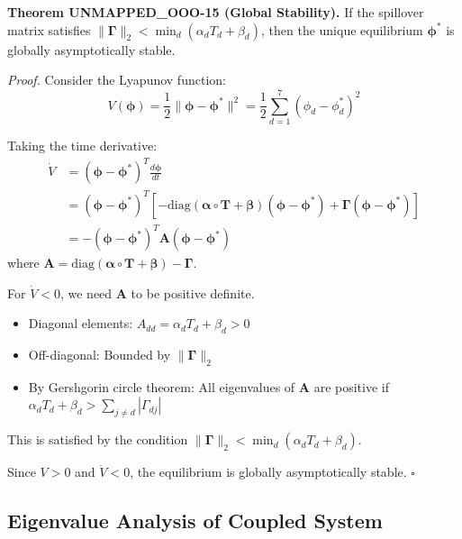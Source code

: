 \begin{tcolorbox}[colback=green!5!white, colframe=green!75!black, title=Theorem UNMAPPED_OOO-15: Global Asymptotic Stability]
\textbf{Theorem UNMAPPED_OOO-15 (Global Stability).}
If the spillover matrix satisfies $\|\boldsymbol{\Gamma}\|_2 < \min_d(\alpha_d T_d + \beta_d)$,
then the unique equilibrium $\boldsymbol{\phi}^*$ is globally asymptotically stable.

\textit{Proof.}
Consider the Lyapunov function:
\begin{equation}
V(\boldsymbol{\phi}) = \frac{1}{2} \|\boldsymbol{\phi} - \boldsymbol{\phi}^*\|^2 = \frac{1}{2} \sum_{d=1}^{7} (\phi_d - \phi_d^*)^2
\end{equation}

Taking the time derivative:
\begin{align}
\dot{V} &= (\boldsymbol{\phi} - \boldsymbol{\phi}^*)^T \frac{d\boldsymbol{\phi}}{dt} \\
&= (\boldsymbol{\phi} - \boldsymbol{\phi}^*)^T \left[-\text{diag}(\boldsymbol{\alpha} \circ \mathbf{T} + \boldsymbol{\beta})(\boldsymbol{\phi} - \boldsymbol{\phi}^*) + \boldsymbol{\Gamma}(\boldsymbol{\phi} - \boldsymbol{\phi}^*)\right] \\
&= -(\boldsymbol{\phi} - \boldsymbol{\phi}^*)^T \mathbf{A} (\boldsymbol{\phi} - \boldsymbol{\phi}^*)
\end{align}
where $\mathbf{A} = \text{diag}(\boldsymbol{\alpha} \circ \mathbf{T} + \boldsymbol{\beta}) - \boldsymbol{\Gamma}$.

For $\dot{V} < 0$, we need $\mathbf{A}$ to be positive definite.
\begin{itemize}[nosep]
\item Diagonal elements: $A_{dd} = \alpha_d T_d + \beta_d > 0$
\item Off-diagonal: Bounded by $\|\boldsymbol{\Gamma}\|_2$
\item By Gershgorin circle theorem: All eigenvalues of $\mathbf{A}$ are positive if
      $\alpha_d T_d + \beta_d > \sum_{j \neq d} |\Gamma_{dj}|$
\end{itemize}
This is satisfied by the condition $\|\boldsymbol{\Gamma}\|_2 < \min_d(\alpha_d T_d + \beta_d)$.

Since $V > 0$ and $\dot{V} < 0$, the equilibrium is globally asymptotically stable.
\hfill $\square$
\end{tcolorbox}

\subsection{Eigenvalue Analysis of Coupled System}

